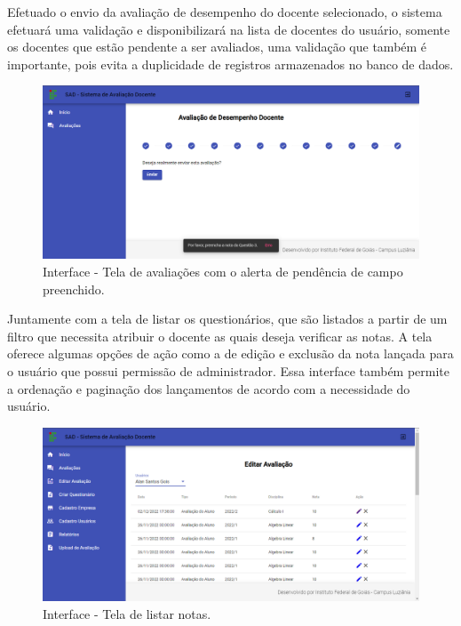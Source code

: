     Efetuado o envio da avaliação de desempenho do docente selecionado, o sistema efetuará uma validação e disponibilizará na lista de docentes do usuário, somente os docentes que estão pendente a ser avaliados, uma validação que também é importante, pois evita a duplicidade de registros armazenados no banco de dados.
 
        \begin{figure}[h]
        \centering
        \includegraphics[width=1.0\textwidth]{./img/AvaliaçõesAlerta.png}
        \caption{Interface - Tela de avaliações com o alerta de pendência de campo preenchido.}
        \label{fig:Alerta}
        \end{figure}

    Juntamente com a tela de listar os questionários, que são listados a partir de um filtro que necessita atribuir o docente as quais deseja verificar as notas. A tela oferece algumas opções de ação como a de edição e exclusão da nota lançada para o usuário que possui permissão de administrador. Essa interface também permite a ordenação e paginação dos lançamentos de acordo com a necessidade do usuário.

        \begin{figure}[h]
        \centering
        \includegraphics[width=1.0\textwidth]{./img/EditarNotas.png}
        \caption{Interface - Tela de listar notas.}
        \label{fig:EditarNota}
        \end{figure}
        
